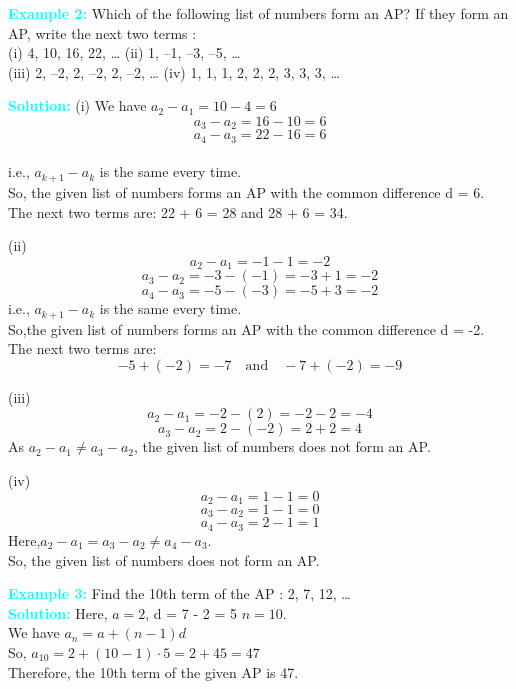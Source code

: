 \documentclass[a4paper,12pt]{article}
\begin{document}
\thispagestyle{fancy}
\vspace*{2em}
\noindent\textbf{\textcolor{cyan}{Example 2:}}
Which of the following list of numbers form an AP? If they form an AP, write the next two terms : \\
(i) 4, 10, 16, 22, \ldots \hspace{1em}
(ii) 1, –1, –3, –5, \ldots \\
(iii) 2, –2, 2, –2, 2, –2, \ldots \hspace{1em}
(iv) 1, 1, 1, 2, 2, 2, 3, 3, 3, \ldots

\noindent\textbf{\textcolor{cyan}{Solution:}} 
(i) We have 
\hspace{0.5cm}\(
a_2 - a_1 = 10 - 4 = 6
\)
\[
a_3 - a_2 = 16 - 10 = 6
\]
\[
a_4 - a_3 = 22 - 16 = 6
\]\\
i.e., \(a_{k+1} - a_k\) is the same every time. \\
So, the given list of numbers forms an  AP with the common difference d = 6.\\
The next two terms are: 22 + 6 = 28  and  28 + 6 = 34.

(ii)
\[
a_2 - a_1 = -1 - 1 = -2
\]
\[
a_3 - a_2 = -3 - (-1) = -3 + 1 = -2
\]
\[
a_4 - a_3 = -5 - (-3) = -5 + 3 = -2
\]
i.e., \(a_{k+1} - a_k\) is the same every time. \\
So,the given list of numbers forms  an AP with the common difference d = -2. \\
The next two terms are: \\
\[
-5 + (-2) = -7 \quad \text{and} \quad -7 + (-2) = -9
\]

(iii)
\[
a_2 - a_1 = -2 - (2) = -2 - 2 = -4
\]
\[
a_3 - a_2 = 2 - (-2) = 2 + 2 = 4
\]
As \(a_2 - a_1 \ne a_3 - a_2\), the given list of numbers does not form an AP.

(iv)
\[
a_2 - a_1 = 1 - 1 = 0
\]
\[
a_3 - a_2 = 1 - 1 = 0
\]
\[
a_4 - a_3 = 2 - 1 = 1
\]
Here,\( a_2 - a_1 = a_3 - a_2 \ne a_4 - a_3\). \\
So, the given list of numbers does not form an AP.

\pagestyle{empty}
\vspace{5em}
\noindent\textbf{\textcolor{cyan}{Example 3:}}
Find the 10th term of the AP : 2, 7, 12, \ldots \\
\noindent\textbf{\textcolor{cyan}{Solution:}} 
Here, \(a = 2\), \quad d = 7 - 2 = 5 \quad {} \quad\( n = 10\). \\
\vspace{2em}
We have 
\hspace{2cm}\(
          a_n = a + (n - 1)d
\) \\
So,
\hspace{3cm}\(
a_{10} = 2 + (10 - 1) \cdot 5 = 2 + 45 = 47
\) \\
Therefore, the 10th term of the given AP is 47.
\end{document}
